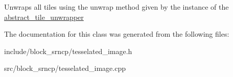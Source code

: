Unwraps all tiles using the unwrap method given by the instance of the \hyperlink{classabstract__tile__unwrapper}{abstract\-\_\-tile\-\_\-unwrapper} 

The documentation for this class was generated from the following files\-:\begin{DoxyCompactItemize}
\item 
include/block\-\_\-srncp/tesselated\-\_\-image.\-h\item 
src/block\-\_\-srncp/tesselated\-\_\-image.\-cpp\end{DoxyCompactItemize}
